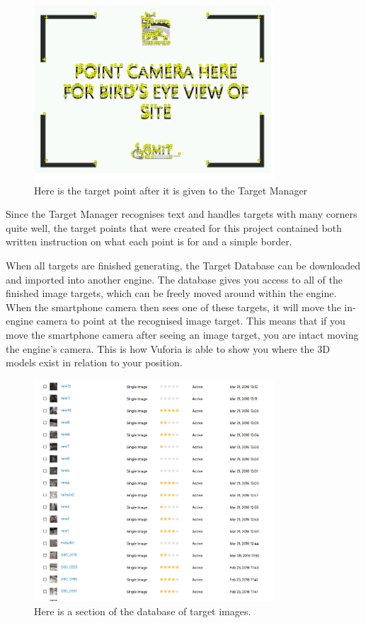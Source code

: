 \clearpage
\begin{figure}[ht!]
	\centering
	\includegraphics[width=90mm]{points}
	\caption{Here is the target point after it is given to the Target Manager \label{overflow}}
\end{figure}


Since the Target Manager recognises text and handles targets with many corners quite well, the target points that were created for this project contained both written instruction on what each point is for and a simple border. 

When all targets are finished generating, the Target Database can be downloaded and imported into another engine. The database gives you access to all of the finished image targets, which can be freely moved around within the engine. When the smartphone camera then sees one of these targets, it will move the in-engine camera to point at the recognised image target. This means that if you move the smartphone camera after seeing an image target, you are intact moving the engine’s camera. This is how Vuforia is able to show you where the 3D models exist in relation to your position.

\begin{figure}[ht!]
	\centering
	\includegraphics[width=90mm]{database}
	\caption{Here is a section of the database of target images. \label{overflow}}
\end{figure}

